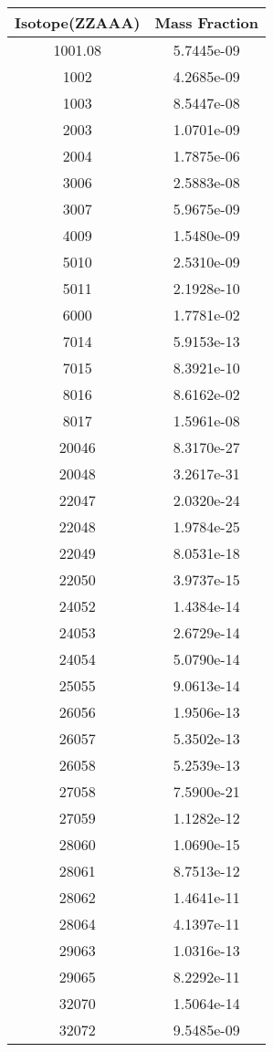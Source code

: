 \begin{table}[h!]
\centering
\begin{tabular}{|| c || c |}
\hline
Isotope(ZZAAA) & Mass Fraction \\
\hline \hline

1001.08 & 5.7445e-09 \\
1002 & 4.2685e-09 \\
1003 & 8.5447e-08 \\
2003 & 1.0701e-09 \\
2004 & 1.7875e-06 \\
3006 & 2.5883e-08 \\
3007 & 5.9675e-09 \\
4009 & 1.5480e-09 \\
5010 & 2.5310e-09 \\
5011 & 2.1928e-10 \\
6000 & 1.7781e-02 \\
7014 & 5.9153e-13 \\
7015 & 8.3921e-10 \\
8016 & 8.6162e-02 \\
8017 & 1.5961e-08 \\
20046 & 8.3170e-27 \\
20048 & 3.2617e-31 \\
22047 & 2.0320e-24 \\
22048 & 1.9784e-25 \\
22049 & 8.0531e-18 \\
22050 & 3.9737e-15 \\
24052 & 1.4384e-14 \\
24053 & 2.6729e-14 \\
24054 & 5.0790e-14 \\
25055 & 9.0613e-14 \\
26056 & 1.9506e-13 \\
26057 & 5.3502e-13 \\
26058 & 5.2539e-13 \\
27058 & 7.5900e-21 \\
27059 & 1.1282e-12 \\
28060 & 1.0690e-15 \\
28061 & 8.7513e-12 \\
28062 & 1.4641e-11 \\
28064 & 4.1397e-11 \\
29063 & 1.0316e-13 \\
29065 & 8.2292e-11 \\
32070 & 1.5064e-14 \\
32072 & 9.5485e-09 \\

\end{tabular}
\end{table}

